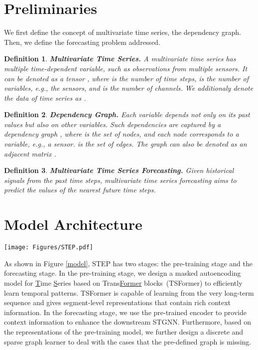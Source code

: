 \documentclass[sigconf]{acmart}
\newcommand{\eg}{\textit{e.g.,}\xspace}
\newtheorem{definition}{Definition}
\begin{document}
 \section{Preliminaries}
We first define the concept of multivariate time series, the dependency graph.
Then, we define the forecasting problem addressed.

\begin{definition}
\textbf{Multivariate Time Series.}
A multivariate time series has multiple time-dependent variable, such as observations from multiple sensors.
It can be denoted as a tensor , where  is the number of time steps,  is the number of variables, \eg the sensors, and  is the number of channels.
We additionaly denote the data of time series  as .
\end{definition}

\begin{definition}
\textbf{Dependency Graph.}
Each variable depends not only on its past values but also on other variables. Such dependencies are captured by a dependency graph , where  is the set of  nodes, and each node corresponds to a variable, \eg a sensor.  is the set of  edges.
The graph can also be denoted as an adjacent matrix .
\end{definition}

\begin{definition}
\textbf{Multivariate Time Series Forecasting.}
Given historical signals  from the past  time steps, multivariate time series forecasting aims to predict the values  of the  nearest future time steps.
\end{definition}
 \section{Model Architecture}
\begin{figure*}[t]
  \centering
  \setlength{\abovecaptionskip}{0.2cm}
  \setlength{\belowcaptionskip}{-0.2cm}
  \texttt{[image: Figures/STEP.pdf]}
  \caption{
  {\color{black}
  The overview of the proposed STEP framework.
  \underline{Left}: the pre-training stage. We split very long-term time series into segments and feed them into TSFormer, which is trained via the masked autoencoding strategy.
  \underline{Right}: the forecasting stage. We enhance the downstream STGNN based on the segment-level representations of the pre-trained TSFormer.}
  }
  \label{model}
\end{figure*}
As shown in Figure \ref{model}, STEP has two stages: the pre-training stage and the forecasting stage.
In the pre-training stage, we design a masked autoencoding model for \underline{T}ime \underline{S}eries based on Trans\underline{Former} blocks~(TSFormer) to efficiently learn temporal patterns.
TSFormer is capable of learning from the very long-term sequence and gives segment-level representations that contain rich context information.
In the forecasting stage, we use the pre-trained encoder to provide context information to enhance the downstream STGNN.
Furthermore, based on the representations of the pre-training model, we further design a discrete and sparse graph learner to deal with the cases that the pre-defined graph is missing.
\end{document}
